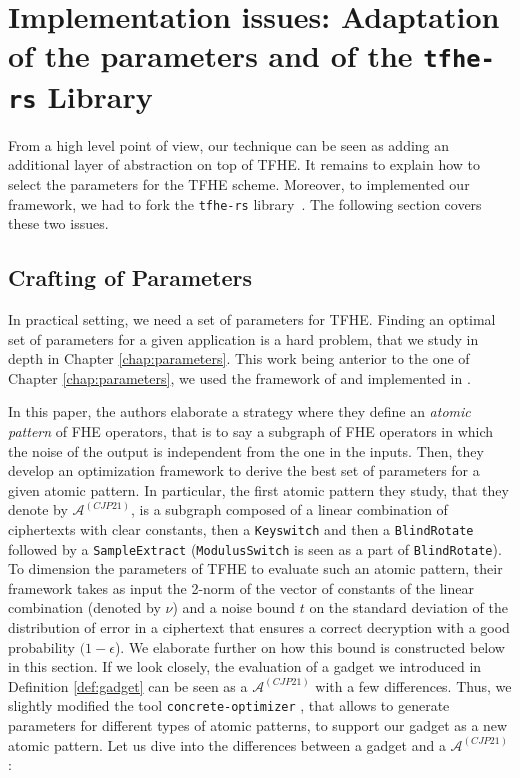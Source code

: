 \section{Implementation issues: Adaptation of the parameters and of the \texttt{tfhe-rs} Library}
\label{sec:p_encodings_TFHE_adaptation}


From a high level point of view, our technique can be seen as adding an additional layer of abstraction on top of TFHE. It remains to explain how to select the parameters for the TFHE scheme. Moreover, to implemented our framework, we had to fork the \texttt{tfhe-rs} library~\cite{tfhe-rs}. The following section covers these two issues.



\subsection{Crafting of Parameters}
\label{sec:parametrization}

In practical setting, we need a set of parameters for TFHE. Finding an optimal set of parameters for a given application is a hard problem, that we study in depth in Chapter \ref{chap:parameters}. This work being anterior to the one of Chapter \ref{chap:parameters}, we used the framework of \cite{AC:CLOT21} and implemented in \cite{concrete-optimizer}.


In this paper, the authors elaborate a strategy where they define an \textit{atomic pattern} of FHE operators, that is to say a subgraph of FHE operators in which the noise of the output is independent from the one in the inputs. Then, they develop an optimization framework to derive the best set of parameters for a given atomic pattern.
%
In particular, the first atomic pattern they study, that they denote by $\mathcal{A}^{(CJP21)}$, is a subgraph composed of a linear combination of ciphertexts with clear constants, then a \texttt{Keyswitch} and then a \texttt{BlindRotate} followed by a \texttt{SampleExtract} (\texttt{ModulusSwitch} is seen as a part of \texttt{BlindRotate}). To dimension the parameters of TFHE to evaluate such an atomic pattern, their framework takes as input the 2-norm of the vector of constants of the linear combination (denoted by $\nu$) and a noise bound $t$ on the standard deviation of the distribution of error in a ciphertext that ensures a correct decryption with a good probability $(1-\epsilon$). We elaborate further on how this bound is constructed below in this section.
%
If we look closely, the evaluation of a gadget we introduced in Definition \ref{def:gadget} can be seen as a $\mathcal{A}^{(CJP21)}$ with a few differences. Thus, we slightly modified the tool \texttt{concrete-optimizer} \cite{concrete-optimizer}, that allows to generate parameters for different types of atomic patterns, to support our gadget as a new atomic pattern. Let us dive into the differences between a gadget and a $\mathcal{A}^{(CJP21)}$:
%
